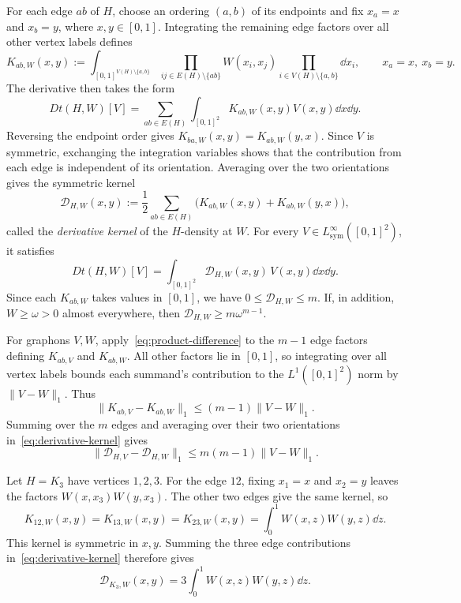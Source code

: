 For each edge $ab$ of $H$, choose an ordering $(a,b)$ of its endpoints
and fix $x_a=x$ and $x_b=y$, where $x,y\in[0,1]$.  Integrating the remaining
edge factors over all other vertex labels defines
\[
  K_{ab,W}(x,y):=\int_{[0,1]^{V(H)\setminus\{a,b\}}}
  \prod_{ij\in E(H)\setminus\{ab\}}W(x_i,x_j)
  \prod_{i\in V(H)\setminus\{a,b\}}\dd x_i,
  \qquad x_a=x,\ x_b=y.
\]
The derivative then takes the form
\[
  Dt(H,W)[V]=\sum_{ab\in E(H)}
  \int_{[0,1]^2}K_{ab,W}(x,y)V(x,y)\dd x\dd y.
\]
Reversing the endpoint order gives $K_{ba,W}(x,y)=K_{ab,W}(y,x)$.
Since $V$ is symmetric, exchanging the integration variables shows that
the contribution from each edge is independent of its orientation.
Averaging over the two orientations gives the symmetric kernel
\begin{equation}\label{eq:derivative-kernel}
  \mathcal D_{H,W}(x,y):=\frac12\sum_{ab\in E(H)}\bigl(K_{ab,W}(x,y)+K_{ab,W}(y,x)\bigr),
\end{equation}
called the \emph{derivative kernel} of the $H$-density at $W$.
For every $V\in L^\infty_{\mathrm{sym}}([0,1]^2)$, it satisfies
\begin{equation}\label{eq:density-derivative}
  Dt(H,W)[V]=\int_{[0,1]^2}\mathcal D_{H,W}(x,y)\,V(x,y)\dd x\dd y.
\end{equation}
Since each $K_{ab,W}$ takes values in $[0,1]$, we have
$0\le\mathcal D_{H,W}\le m$.
If, in addition, $W\ge\omega>0$ almost everywhere, then
$\mathcal D_{H,W}\ge m\omega^{m-1}$.

For graphons $V,W$, apply~\eqref{eq:product-difference} to the $m-1$
edge factors defining $K_{ab,V}$ and $K_{ab,W}$. All other factors lie
in $[0,1]$, so integrating over all vertex labels bounds each summand's
contribution to the $L^1([0,1]^2)$ norm by $\|V-W\|_1$. Thus
\[
  \|K_{ab,V}-K_{ab,W}\|_1\le(m-1)\|V-W\|_1.
\]
Summing over the $m$ edges and averaging over their two orientations
in~\eqref{eq:derivative-kernel} gives
\begin{equation}\label{eq:derivative-kernel-lipschitz}
  \|\mathcal D_{H,V}-\mathcal D_{H,W}\|_1
  \le m(m-1)\|V-W\|_1.
\end{equation}

\begin{expl}\label{expl:triangle-derivative}
Let $H=K_3$ have vertices $1,2,3$.  For the edge $12$, fixing
$x_1=x$ and $x_2=y$ leaves the factors $W(x,x_3)W(y,x_3)$.
The other two edges give the same kernel, so
\[
  K_{12,W}(x,y)=K_{13,W}(x,y)=K_{23,W}(x,y)
  =\int_0^1W(x,z)W(y,z)\dd z.
\]
This kernel is symmetric in $x,y$.  Summing the three edge contributions
in~\eqref{eq:derivative-kernel} therefore gives
\[
  \mathcal D_{K_3,W}(x,y)=3\int_0^1W(x,z)W(y,z)\dd z.
\]
\end{expl}

